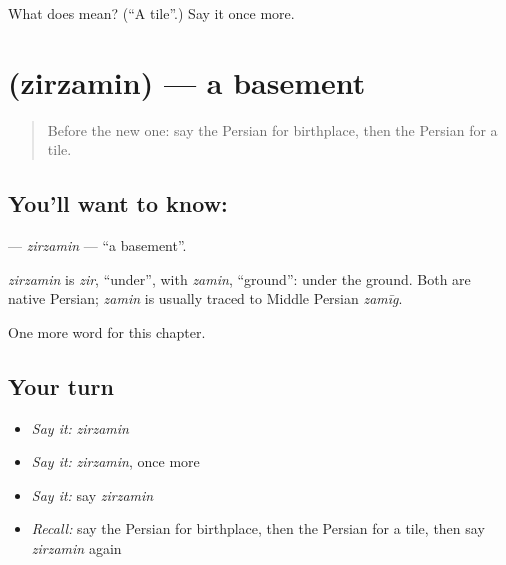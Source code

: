 \begin{tcolorbox}[breakable,colback=teal!4,colframe=teal!35!black,title={Before you move on}]
What does  mean? (\textquotedblleft{}A tile\textquotedblright{}.) Say it once more.
\end{tcolorbox}
\section[\texorpdfstring{\fa{زیرزمین} (zirzamin)}{زیرزمین (zirzamin)}]{ (zirzamin) — a basement}

\label{lesson:FA-C232-zirzamin}



\begin{quote}
Before the new one: say the Persian for birthplace, then the Persian for a tile.
\end{quote}

\subsection*{You'll want to know: }
\textbf{} — \emph{zirzamin} — \textquotedblleft{}a basement\textquotedblright{}.

\begin{cousinweb}
\emph{zirzamin} is \emph{zir}, \textquotedblleft{}under\textquotedblright{}, with \emph{zamin}, \textquotedblleft{}ground\textquotedblright{}: under the ground. Both are native Persian; \emph{zamin} is usually traced to Middle Persian \emph{zamīg}.
\end{cousinweb}

\begin{grammarlens}[title={What you've built}]
One more word for this chapter.
\end{grammarlens}

\subsection*{Your turn}
\begin{itemize}
\raggedright
  \item \emph{Say it:} \emph{zirzamin}
  \item \emph{Say it:} \emph{zirzamin}, once more
  \item \emph{Say it:} say \emph{zirzamin}
  \item \emph{Recall:} say the Persian for birthplace, then the Persian for a tile, then say \emph{zirzamin} again
\end{itemize}

